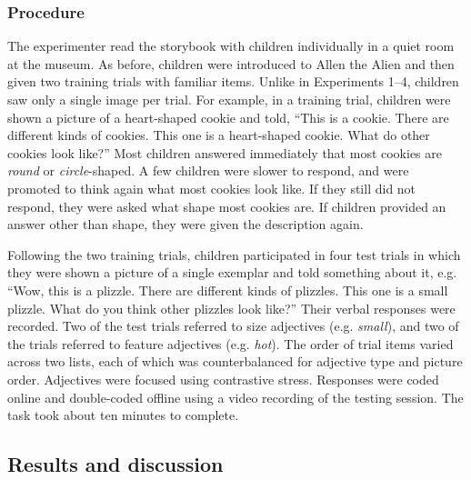 \documentclass[man]{apa2}
\begin{document}
\subsubsection{Procedure}

The experimenter read the storybook with children individually in a quiet room at the museum. As before, children were introduced to Allen the Alien and then given two training trials with familiar items. Unlike in  Experiments 1--4, children saw only a single image per trial. For example, in a training trial, children were shown a picture of a heart-shaped cookie and told, ``This is a cookie.  There are different kinds of cookies.  This one is a heart-shaped cookie.  What do other cookies look like?'' Most children answered immediately that most cookies are \emph{round} or \emph{circle}-shaped. A few children were slower to respond, and were promoted to think again what most cookies look like. If they still did not respond, they were asked what shape most cookies are.  If children provided an answer other than shape, they were given the description again.

Following the two training trials, children participated in four test trials in which they were shown a picture of a single exemplar and told something about it, e.g. ``Wow, this is a plizzle. There are different kinds of plizzles. This one is a small plizzle.  What do you think other plizzles look like?'' Their verbal responses were recorded.  Two of the test trials referred to size adjectives (e.g. \emph{small}), and two of the trials referred to feature adjectives (e.g. \emph{hot}).  The order of trial items varied across two lists, each of which was counterbalanced for adjective type and picture order.  Adjectives were focused using contrastive stress. Responses were coded online and double-coded offline using a video recording of the testing session.  The task took about ten minutes to complete. 

\subsection{Results and discussion}
\end{document}
